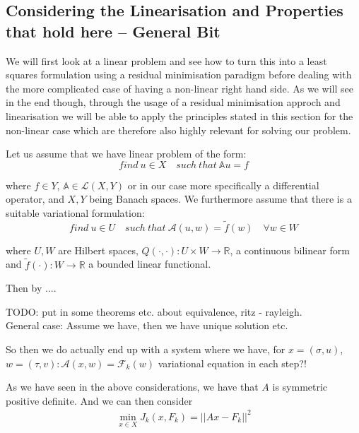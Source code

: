 \documentclass[fleqn, a4paper, 11pt, bibliography=totoc]{report}
\begin{document}
\subsection{Considering the Linearisation and Properties that hold here -- General Bit}

We will first look at a linear problem and see how to turn this into a least squares formulation using a residual minimisation paradigm before dealing with the more complicated case of having a non-linear right hand side. As we will see in the end though, through the usage of a residual minimisation approch and linearisation we will be able to apply the principles stated in this section for the non-linear case which are therefore also highly relevant for solving our problem. 

Let us assume that we have linear problem of the form:
\begin{equation}
find \ u \in X \quad such \ that \ \mathbb{A} u = f
\end{equation}

where $f \in Y$, $\mathbb{A} \in \mathcal{L}(X,Y)$ or in our case more specifically a differential operator, and $X,Y$ being Banach spaces. We furthermore assume that there is a suitable variational formulation:
\begin{equation}
find \ u \in U \quad such \ that \ \mathcal{A}(u,w) = \tilde{f}(w) \quad \forall w \in W
\end{equation}

where $U,W$ are Hilbert spaces, $Q(\cdot,\cdot) : U \times W \rightarrow \mathbb{R}$, a continuous bilinear form and $\tilde{f}(\cdot): W \rightarrow \mathbb{R}$ a bounded linear functional. 

Then by .... 




TODO: put in some theorems etc. about equivalence, ritz - rayleigh. \\
General case: Assume we have, then we have unique solution etc. 

So then we do actually end up with a system where we have, for $x = (\sigma, u)$, $w = (\tau, v) : \mathcal{A}(x, w) = \mathcal{F}_k(w)$ variational equation in each step?! 

As we have seen in the above considerations, we have that $A$ is symmetric positive definite. And we can then consider 
\begin{align*}
\min_{x \in X} J_k(x, F_k) = || A x - F_k ||^2
\end{align*}
\end{document}
